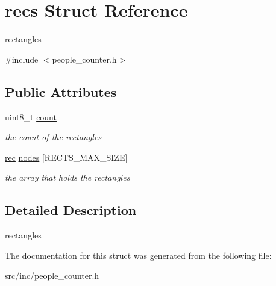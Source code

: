 \hypertarget{structrecs}{}\section{recs Struct Reference}
\label{structrecs}


rectangles  




{\ttfamily \#include $<$people\+\_\+counter.\+h$>$}

\subsection*{Public Attributes}
\begin{DoxyCompactItemize}
\item 
\mbox{\label{structrecs_a8e2355320f4d624893ffb2123a1df4b2}} 
uint8\+\_\+t \mbox{\hyperlink{structrecs_a8e2355320f4d624893ffb2123a1df4b2}{count}}
\begin{DoxyCompactList}\small\item\em the count of the rectangles \end{DoxyCompactList}\item 
\mbox{\label{structrecs_a5843c55a8291dd88487cac1c83429077}} 
\mbox{\hyperlink{structrec}{rec}} \mbox{\hyperlink{structrecs_a5843c55a8291dd88487cac1c83429077}{nodes}} \mbox{[}R\+E\+C\+T\+S\+\_\+\+M\+A\+X\+\_\+\+S\+I\+ZE\mbox{]}
\begin{DoxyCompactList}\small\item\em the array that holds the rectangles \end{DoxyCompactList}\end{DoxyCompactItemize}


\subsection{Detailed Description}
rectangles 

The documentation for this struct was generated from the following file\+:\begin{DoxyCompactItemize}
\item 
src/inc/people\+\_\+counter.\+h\end{DoxyCompactItemize}
